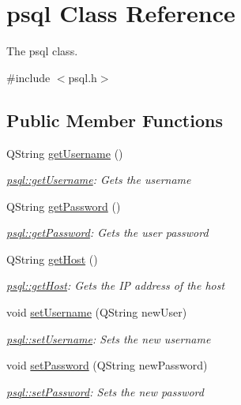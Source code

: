 \hypertarget{classpsql}{}\section{psql Class Reference}
\label{classpsql}


The psql class.  




{\ttfamily \#include $<$psql.\+h$>$}

\subsection*{Public Member Functions}
\begin{DoxyCompactItemize}
\item 
Q\+String \hyperlink{classpsql_aecc9fd93dc5ca0c4f4a63d445a36d166}{get\+Username} ()
\begin{DoxyCompactList}\small\item\em \hyperlink{classpsql_aecc9fd93dc5ca0c4f4a63d445a36d166}{psql\+::get\+Username}\+: Gets the username \end{DoxyCompactList}\item 
Q\+String \hyperlink{classpsql_a817e5a88f877cac6f843c1e743aec096}{get\+Password} ()
\begin{DoxyCompactList}\small\item\em \hyperlink{classpsql_a817e5a88f877cac6f843c1e743aec096}{psql\+::get\+Password}\+: Gets the user password \end{DoxyCompactList}\item 
Q\+String \hyperlink{classpsql_a95d06ee661db0b9cf72605b983b04613}{get\+Host} ()
\begin{DoxyCompactList}\small\item\em \hyperlink{classpsql_a95d06ee661db0b9cf72605b983b04613}{psql\+::get\+Host}\+: Gets the IP address of the host \end{DoxyCompactList}\item 
void \hyperlink{classpsql_a1488a9e4909abd172651b7be240342cb}{set\+Username} (Q\+String new\+User)
\begin{DoxyCompactList}\small\item\em \hyperlink{classpsql_a1488a9e4909abd172651b7be240342cb}{psql\+::set\+Username}\+: Sets the new username \end{DoxyCompactList}\item 
void \hyperlink{classpsql_a6c29350037550b7e5a5bb8f439c405f3}{set\+Password} (Q\+String new\+Password)
\begin{DoxyCompactList}\small\item\em \hyperlink{classpsql_a6c29350037550b7e5a5bb8f439c405f3}{psql\+::set\+Password}\+: Sets the new password \end{DoxyCompactList}\item 

\end{DoxyCompactItemize}
